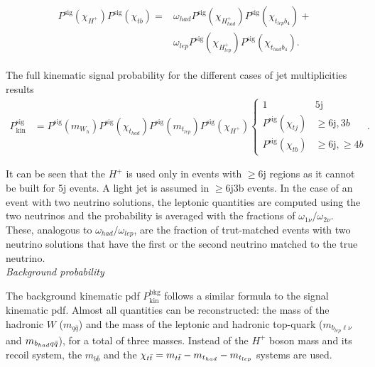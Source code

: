 \begin{align}
    \begin{split}
        P^{\text{sig}}(\chi_{H^+})P^{\text{sig}}(\chi_{tb})=&\omega_{had}P^{\text{sig}}(\chi_{H^+_{had}})P^{\text{sig}}(\chi_{t_{lep}b_4})+\\
        &\omega_{lep}P^{\text{sig}}(\chi_{H^+_{lep}})P^{\text{sig}}(\chi_{t_{had}b_4}).
    \end{split}
\end{align}

The full kinematic signal probability for the different cases of jet multiplicities results
\begin{align}
    P_{\text{kin}}^{\text{sig}}&=P^{\text{sig}}(m_{W_h})P^{\text{sig}}(\chi_{t_{had}})P^{\text{sig}}(m_{t_{lep}})P^{\text{sig}}(\chi_{H^+})\begin{cases}1 & 5\text{j} \\ P^{\text{sig}}(\chi_{tj})&\geq6\text{j},3b\\P^{\text{sig}}(\chi_{tb})& \geq6\text{j},\geq4b\end{cases}.
\end{align}

It can be seen that the $H^+$ is used only in events with $\geq$6j regions as it cannot be built for 5j events. A light jet is assumed in $\geq$6j3b events. In the case of an event with two neutrino solutions, the leptonic quantities are computed using the two neutrinos and the probability is averaged with the fractions of $\omega_{1\nu}/\omega_{2\nu}$. These, analogous to $\omega_{had}/\omega_{lep}$, are the fraction of trut-matched events with two neutrino solutions that have the first or the second neutrino matched to the true neutrino.\\


\textit{Background probability}

The background kinematic pdf $P_{\text{kin}}^{\text{bkg}}$ follows a similar formula to the signal kinematic pdf. Almost all quantities can be reconstructed: the mass of the hadronic $W$ ($m_{q\bar{q}}$) and the mass of the leptonic and hadronic top-quark ($m_{b_{lep}\ell\nu}$ and $m_{b_{had}q\Bar{q}}$), for a total of three masses. Instead of the $H^+$ boson mass and its recoil system, the $m_{b\bar{b}}$ and the $\chi_{t\bar{t}}=m_{t\bar{t}}-m_{t_{had}}-m_{t_{lep}}$ systems are used.\\

